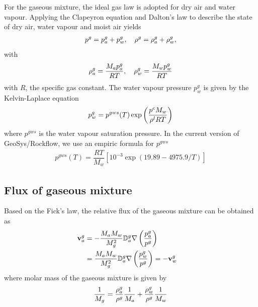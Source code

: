For the gaseous mixture, the ideal gas law is adopted for dry air and water vapour. Applying the Clapeyron equation and Dalton's law to describe the state of dry air, water vapour and moist air yields
\begin{align}
p^g=p^g_a+p^g_w,\quad \rho^g=\rho^g_a+\rho^g_w,
\end{align}
with
\begin{align}
\rho^g_a = \dfrac{M_a p_a^g}{RT}, \quad \rho^g_w = \dfrac{M_w p_w^g}{RT}
\end{align}
with $R$, the specific gas constant.
The water vapour pressure $p^g_w$ is given by the Kelvin-Laplace equation
\begin{align}
p^g_w = p^{gws}(T) \exp \left(\dfrac{p^c M_w }{\rho^lRT}\right)
\end{align}
where $p^{gws}$ is the water vapour saturation pressure. In the current version of GeoSys/Rockflow, we use an empiric formula for $p^{gws}$
\begin{align}
p^{gws}(T) =  \dfrac{RT}{M_w }\left[10^{-3}\exp\left(19.89-4975.9/T\right)\right]
\end{align}


%
%

\subsection{Flux of gaseous mixture}

Based on the Fick's law, the relative flux of the gaseous mixture can be obtained as
\begin{align}
{\bf v}^g_a& = -\dfrac{M_a M_w}{M_g^2}{\mathbb D^g_a}\nabla\left(\dfrac{p^g_a}{p^g}\right)\\
&=\dfrac{M_a M_w}{M_g^2}{\mathbb D^g_a}\nabla\left(\dfrac{p^g_w}{p^g}\right) = -{\bf v}^g_w& 
\end{align}
where molar mass of the gaseous mixture is given by
\begin{align}
\dfrac{1}{M_g}=\dfrac{\rho^g_a}{\rho^g}\dfrac{1}{M_a}+\dfrac{\rho^g_w}{\rho^g}\dfrac{1}{M_w}
\end{align}
 


